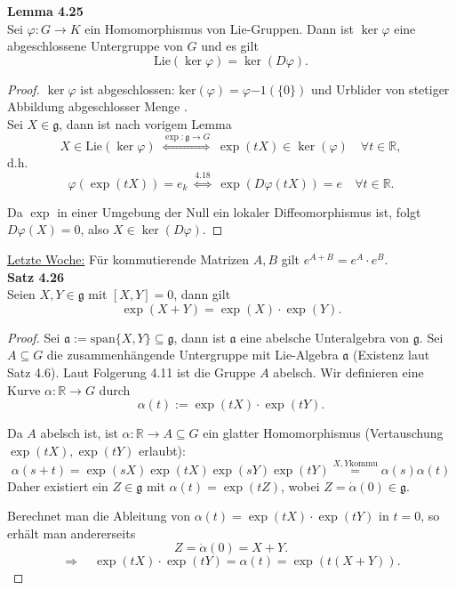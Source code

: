 \documentclass[fleqn, 12pt, letterpaper]{article}
\newcommand{\txt}[1]{\text{#1}}
\begin{document}
\textbf{Lemma 4.25}\\
Sei $\varphi \colon G \to K$ ein Homomorphismus von Lie-Gruppen. Dann ist $\ker \varphi$ eine abgeschlossene Untergruppe von $G$ und es gilt
\[
\mathrm{Lie}(\ker \varphi) = \ker(D\varphi).
\]
\begin{proof}
  $\ker \varphi$ ist abgeschlossen: $\mathrm{ker}(\varphi)=\varphi{-1}(\{0\})$ und Urblider von stetiger Abbildung abgeschlosser Menge .\\
    Sei $X \in \mathfrak{g}$, dann ist nach vorigem Lemma
\[
X \in \mathrm{Lie}(\ker \varphi) \; \overset{\exp: \mathfrak{g}\rightarrow G}{\Leftrightarrow }\; \exp(tX) \in \ker(\varphi) \quad \forall t \in \mathbb{R},
\]
d.h.
\[
\varphi(\exp(tX)) = e_k \; \overset{4.18}{\Leftrightarrow} \; \exp(D\varphi(tX)) = e \quad \forall t \in \mathbb{R}.
\]

Da $\exp$ in einer Umgebung der Null ein lokaler Diffeomorphismus ist, folgt $D\varphi(X) = 0$, also $X \in \ker(D\varphi)$.
\end{proof}

\underline{Letzte Woche:}
Für kommutierende Matrizen $A, B$ gilt $e^{A+B} = e^A \cdot e^B$.\\

\textbf{Satz 4.26}\\
Seien $X, Y \in \mathfrak{g}$ mit $[X, Y] = 0$, dann gilt
\[
\exp(X + Y) = \exp(X) \cdot \exp(Y).
\]
\begin{proof}
    Sei $\mathfrak{a} := \mathrm{span} \{X, Y\} \subseteq \mathfrak{g}$, dann ist $\mathfrak{a}$ eine abelsche Unteralgebra von $\mathfrak{g}$. Sei $A \subseteq G$ die zusammenhängende Untergruppe mit Lie-Algebra $\mathfrak{a}$ (Existenz laut Satz 4.6). Laut Folgerung 4.11 ist die Gruppe $A$ abelsch. Wir definieren eine Kurve $\alpha \colon \mathbb{R} \to G$ durch
\[
\alpha(t) := \exp(tX) \cdot \exp(tY).
\]

Da $A$ abelsch ist, ist $\alpha \colon \mathbb{R} \to A \subseteq G$ ein glatter Homomorphismus (Vertauschung $\exp(tX), \exp(tY)$ erlaubt):
\[\alpha(s+t)=\exp(sX)\exp(tX)\exp(sY)\exp(tY)\overset{X,Y\txt{kommu}}{=}\alpha(s)\alpha(t)\]
Daher existiert ein $Z \in \mathfrak{g}$ mit $\alpha(t) = \exp(tZ)$, wobei $Z = \dot{\alpha}(0)\in\mathfrak{g}$.

Berechnet man die Ableitung von $\alpha(t) = \exp(tX) \cdot \exp(tY)$ in $t=0$, so erhält man andererseits
\[
Z=\dot{\alpha}(0) = X + Y.
\]
\[
\Rightarrow \quad \exp(tX) \cdot \exp(tY) = \alpha(t) = \exp(t(X + Y)).
\]
\end{proof}
\end{document}
